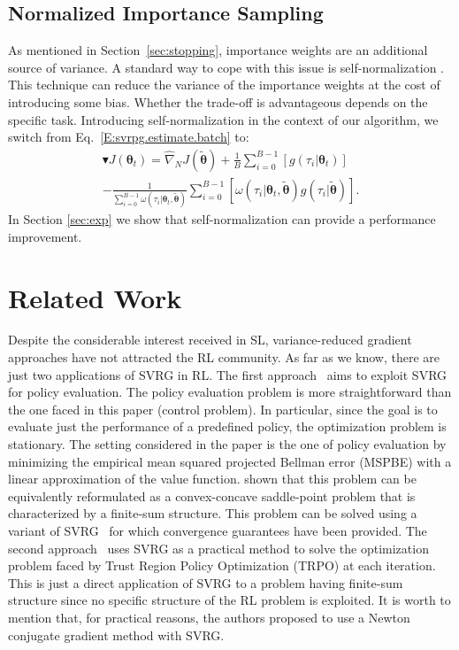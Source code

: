 \documentclass{article}
\theoremstyle{remark}
\theoremstyle{definition}
\newcommand{\vtheta}{\boldsymbol{\theta}}
\newcommand{\wt}[1]{\widetilde{#1}}
\newcommand{\wh}[1]{\widehat{#1}}
\begin{document}
\subsection{Normalized Importance Sampling}\label{sec:prac}
As mentioned in Section~\ref{sec:stopping}, importance weights are an additional source of variance. A standard way to cope with this issue is self-normalization \citep{precup2000eligibility}.
This technique can reduce the variance of the importance weights at the cost of introducing some bias. Whether the trade-off is advantageous depends on the specific task.  
Introducing self-normalization in the context of our algorithm, we switch from Eq.~\eqref{E:svrpg.estimate.batch} to:
\begin{align*}
\blacktriangledown J(\vtheta_{t}) = \wh{\nabla}_N J(\wt{\vtheta})
 + \frac{1}{B} \sum_{i=0}^{B-1} \left[
g(\tau_i|\vtheta_t)\right]\\ 
- \frac{1}{ \sum_{i=0}^{B-1}\omega(\tau_i|\vtheta_t, \wt{\vtheta})} \sum_{i=0}^{B-1} \left[ \omega(\tau_i|\vtheta_t, \wt{\vtheta}) g(\tau_i|\wt{\vtheta})
\right].
\end{align*}
In Section \ref{sec:exp} we show that self-normalization can provide a performance improvement.

\section{Related Work}
Despite the considerable interest received in SL, variance-reduced gradient approaches have not attracted the RL community.
As far as we know, there are just two applications of SVRG in RL.
The first approach~\citep{du2017svrgpe} aims to exploit SVRG for policy evaluation.
The policy evaluation problem is more straightforward than the one faced in this paper (control problem).
In particular, since the goal is to evaluate just the performance of a predefined policy, the optimization problem is stationary.
The setting considered in the paper is the one of policy evaluation by minimizing the empirical mean squared projected Bellman error (MSPBE) with a linear approximation of the value function. \citet{du2017svrgpe} shown that this problem can be equivalently reformulated as a convex-concave saddle-point problem that is characterized by a finite-sum structure.
This problem can be solved using a variant of SVRG~\citep{Palaniappan2016svrgsaddle} for which convergence guarantees have been provided.
The second approach~\citep{xu2017svrgtrpo} uses SVRG as a practical method to solve the optimization problem faced by Trust Region Policy Optimization (TRPO) at each iteration. This is just a direct application of SVRG to a problem having finite-sum structure since no specific structure of the RL problem is exploited.
It is worth to mention that, for practical reasons, the authors proposed to use a Newton conjugate gradient method with SVRG.
\end{document}
